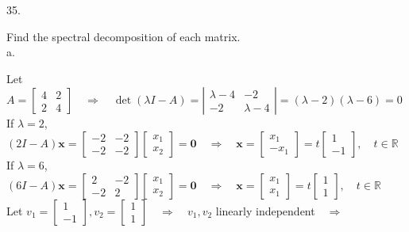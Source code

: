 \documentclass[12pt]{book}
\begin{document}
\begin{CJK}{UTF8}{bsmi}
35. \begin{minipage}[t]{\dimexpr\linewidth}
Find the spectral decomposition of each matrix. \\
a. \begin{minipage}[t]{\dimexpr\linewidth}
Let $A=\begin{bmatrix}
4 & 2 \\
2 & 4
\end{bmatrix}\quad\Rightarrow\quad\det(\lambda I-A)=\left|\begin{matrix}
\lambda-4 & -2 \\
-2 & \lambda-4
\end{matrix}\right|=(\lambda-2)(\lambda-6)=0$ \\
If $\lambda=2$, $(2I-A)\textbf{x}=\begin{bmatrix}
-2 & -2 \\
-2 & -2
\end{bmatrix}\begin{bmatrix}
x_1 \\ x_2
\end{bmatrix}=\textbf{0}\quad\Rightarrow\quad\textbf{x}=\begin{bmatrix}
x_1 \\ -x_1
\end{bmatrix}=t\begin{bmatrix}
1 \\ -1
\end{bmatrix},\quad t\in\mathbb{R}$ \\
If $\lambda=6$, $(6I-A)\textbf{x}=\begin{bmatrix}
2  & -2 \\
-2 & 2
\end{bmatrix}\begin{bmatrix}
x_1 \\ x_2
\end{bmatrix}=\textbf{0}\quad\Rightarrow\quad\textbf{x}=\begin{bmatrix}
x_1 \\ x_1
\end{bmatrix}=t\begin{bmatrix}
1 \\ 1
\end{bmatrix},\quad t\in\mathbb{R}$ \\ 
Let $v_1=\begin{bmatrix}
1 \\ -1
\end{bmatrix}, v_2=\begin{bmatrix}
1 \\ 1
\end{bmatrix}\quad\Rightarrow\quad v_1, v_2$ linearly independent$\quad\Rightarrow\quad$

\end{minipage}
\end{minipage}
\end{CJK}
\end{document}

